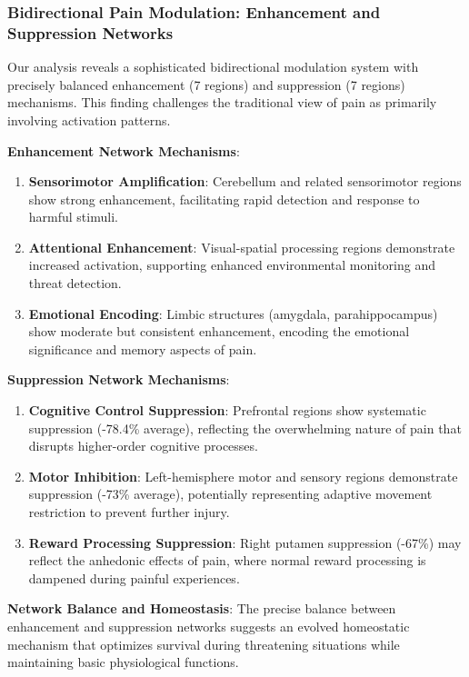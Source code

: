 \documentclass[10pt,journal,compsoc]{IEEEtran}
\begin{document}
\subsubsection{Bidirectional Pain Modulation: Enhancement and Suppression Networks}

Our analysis reveals a sophisticated bidirectional modulation system with precisely balanced enhancement (7 regions) and suppression (7 regions) mechanisms. This finding challenges the traditional view of pain as primarily involving activation patterns.

\textbf{Enhancement Network Mechanisms}:

\begin{enumerate}
\item \textbf{Sensorimotor Amplification}: Cerebellum and related sensorimotor regions show strong enhancement, facilitating rapid detection and response to harmful stimuli.

\item \textbf{Attentional Enhancement}: Visual-spatial processing regions demonstrate increased activation, supporting enhanced environmental monitoring and threat detection.

\item \textbf{Emotional Encoding}: Limbic structures (amygdala, parahippocampus) show moderate but consistent enhancement, encoding the emotional significance and memory aspects of pain.
\end{enumerate}

\textbf{Suppression Network Mechanisms}:

\begin{enumerate}
\item \textbf{Cognitive Control Suppression}: Prefrontal regions show systematic suppression (-78.4\% average), reflecting the overwhelming nature of pain that disrupts higher-order cognitive processes.

\item \textbf{Motor Inhibition}: Left-hemisphere motor and sensory regions demonstrate suppression (-73\% average), potentially representing adaptive movement restriction to prevent further injury.

\item \textbf{Reward Processing Suppression}: Right putamen suppression (-67\%) may reflect the anhedonic effects of pain, where normal reward processing is dampened during painful experiences.
\end{enumerate}

\textbf{Network Balance and Homeostasis}:
The precise balance between enhancement and suppression networks suggests an evolved homeostatic mechanism that optimizes survival during threatening situations while maintaining basic physiological functions.
\end{document}
